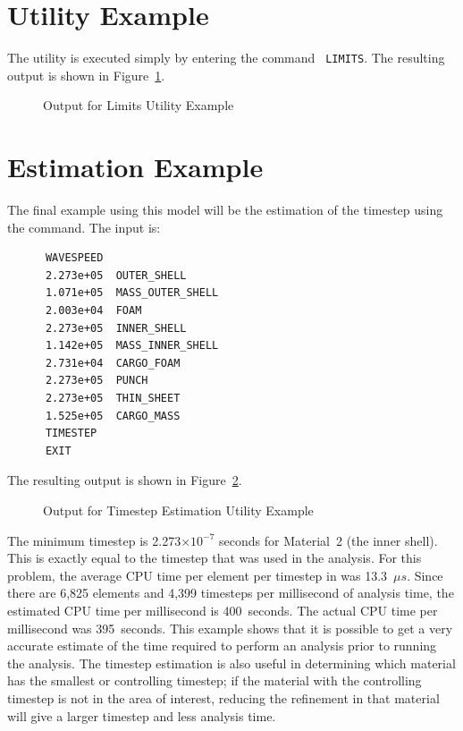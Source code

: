 \section{ Utility Example}
The  utility is executed simply by entering the command {\tt
LIMITS}.  The resulting output is shown in Figure~\ref{exlimitsout}.

\begin{figure}

\caption{Output for Limits Utility Example}\label{exlimitsout}
\end{figure}

\section{ Estimation Example}

The final example using this model will be the estimation of the
timestep using the  command.  The input is:

\begin{verbatim}
      WAVESPEED
      2.273e+05  OUTER_SHELL
      1.071e+05  MASS_OUTER_SHELL
      2.003e+04  FOAM
      2.273e+05  INNER_SHELL
      1.142e+05  MASS_INNER_SHELL
      2.731e+04  CARGO_FOAM
      2.273e+05  PUNCH
      2.273e+05  THIN_SHEET
      1.525e+05  CARGO_MASS
      TIMESTEP
      EXIT
\end{verbatim}

The resulting output is shown in Figure~\ref{extimestepout}.

\begin{figure}

\caption{Output for Timestep Estimation Utility
Example}\label{extimestepout}
\end{figure}
The minimum timestep is 2.273$\times 10^{-7}$ seconds for Material~2 (the inner
shell).  This is exactly equal to the timestep that was used in
the  analysis.  For this problem, the average CPU time
per element per timestep in  was 13.3~$\mu s$.  Since
there are 6,825 elements and 4,399 timesteps per millisecond of analysis
time, the estimated CPU time per millisecond is 400~seconds.  The actual
CPU time per millisecond was 395~seconds.  This example shows that it is
possible to get a very accurate estimate of the time required to perform
an analysis prior to running the analysis.  The timestep estimation is
also useful in determining which material has the smallest or
controlling timestep; if the material with the controlling timestep is
not in the area of interest, reducing the refinement in that material
will give a larger timestep and less analysis time.
